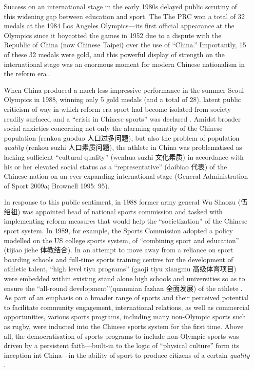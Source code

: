Success on an international stage in the early 1980s delayed public scrutiny of this widening gap between education and sport. The The PRC won a total of 32 medals at the 1984 Los Angeles Olympics---its first official appearance at the Olympics since it boycotted the games in 1952 due to a dispute with the Republic of China (now Chinese Taipei) over the use of ``China.''  Importantly, 15 of these 32 medals were gold, and this powerful display of strength on the international stage was an enormous moment for modern Chinese nationalism in the reform era \citep{Brownell2008}.

When China produced a much less impressive performance in the summer Seoul Olympics in 1988, winning only 5 gold medals (and a total of 28), latent public criticism of way in which reform era sport had become isolated from society readily surfaced and a ``crisis in Chinese sports'' was declared \citep[199]{Brownell1995}.  Amidst broader social anxieties concerning not only the alarming quantity of the Chinese population (renkou guoduo 人口过多问题), but also the problem of population \textit{quality} (renkou suzhi 人口素质问题), the athlete in China was problematised as lacking sufficient ``cultural quality'' (wenhua suzhi 文化素质) in accordance with his or her elevated social status as a ``representative'' (daibiao 代表) of the Chinese nation on an ever-expanding international stage (General Administration of Sport 2009a; Brownell 1995: 95).

In response to this public sentiment, in 1988 former army general Wu Shaozu (伍绍祖) was appointed head of national sports commission and tasked with implementing reform measures that would help the ``societization'' of the Chinese sport system. In 1989, for example, the Sports Commission adopted a policy modelled on the US college sports system, of ``combining sport and education'' (tijiao jiehe 体教结合).  In an attempt to move away from a reliance on sport boarding schools and full-time sports training centres for the development of athletic talent, ``high level tiyu programs'' (gaoji tiyu xiangmu 高级体育项目) were embedded within existing stand alone high schools and universities so as to ensure the ``all-round development''(quanmian fazhan 全面发展) of the athlete \citep[203]{Brownell1995}.  As part of an emphasis on a broader range of sports and their perceived potential to facilitate community engagement, international relations, as well as commercial opportunities, various sports programs, including many non-Olympic sports such as rugby, were inducted into the Chinese sports system for the first time\citep[70]{Knuttgen1990}.  Above all, the  democratisation of sports programs to include non-Olympic sports was driven by a persistent faith---built-in to the logic of ``physical culture'' form its inception int China---in the ability of sport to produce citizens of a certain \textit{quality} \citep[7]{Woronov2003}.

